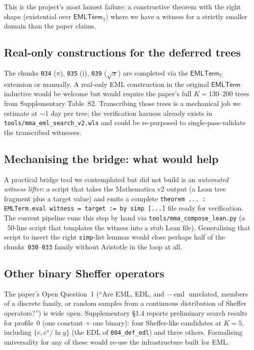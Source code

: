 \documentclass[11pt,a4paper]{article}
\theoremstyle{plain}
\theoremstyle{definition}
\newcommand{\eml}{\operatorname{eml}}
\newcommand{\C}{\mathbb{C}}
\newcommand{\imu}{\mathrm{i}}
\newcommand{\EMLT}{\mathsf{EMLTerm}}
\newcommand{\EMLTC}{\mathsf{EMLTerm}_\C}
\begin{document}
This is the project's most honest failure: a constructive theorem with
the right shape (existential over $\EMLT_1$) where we have a witness
for a strictly smaller domain than the paper claims.

\subsection{Real-only constructions for the deferred trees}

The chunks \texttt{034} ($\pi$), \texttt{035} ($\imu$),
\texttt{039} ($\sqrt{x}$) are completed via the $\EMLTC$ extension or
manually.  A real-only EML construction in the original $\EMLT$ inductive
would be welcome but would require the paper's full $K=130$--$200$ trees
from Supplementary Table~S2.  Transcribing those trees is a
mechanical job we estimate at $\sim$1 day per tree; the
verification harness already exists in
\texttt{tools/mma\_eml\_search\_v2.wls} and could be re-purposed to
single-pass-validate the transcribed witnesses.

\subsection{Mechanising the bridge: what would help}

A practical bridge tool we contemplated but did not build is an
\emph{automated witness lifter}: a script that takes the Mathematica v2
output (a Lean tree fragment plus a target value) and emits a complete
\texttt{theorem ... : EMLTerm.eval witness = target := by simp [...]}
file ready for verification.  The current pipeline runs this step by
hand via \texttt{tools/mma\_compose\_lean.py} (a ~50-line script that
templates the witness into a stub Lean file).  Generalising that script
to insert the right \texttt{simp}-list lemmas would close perhaps half
of the chunks~\texttt{030}--\texttt{033} family without Aristotle in
the loop at all.

\subsection{Other binary Sheffer operators}

The paper's Open Question~1 (``Are EML, EDL, and $-\eml$ unrelated,
members of a discrete family, or random samples from a continuous
distribution of Sheffer operators?'') is wide open.  Supplementary
§1.4 reports preliminary search results for profile~0 (one constant +
one binary): four Sheffer-like candidates at $K=5$, including
$\{e,e^x/\ln y\}$ (the EDL of \texttt{004\_def\_edl}) and three
others.  Formalising universality for any of these would re-use the
infrastructure built for EML.
\end{document}
